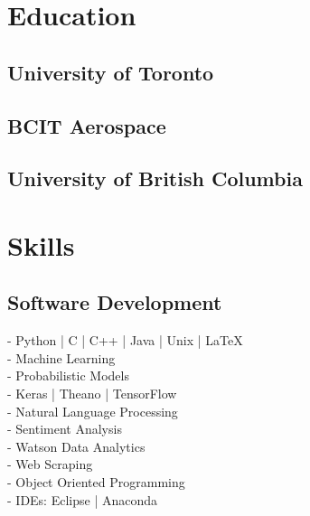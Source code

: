 \documentclass[]{deedy-resume-openfont}
\begin{document}
\begin{minipage}[t]{0.35\textwidth} 


\section{Education} 

\subsection{University of Toronto}
\sectionsep

\subsection{BCIT Aerospace}
\sectionsep

\subsection{University of British Columbia}
\sectionsep


\section{Skills}

\subsection{Software Development}
- Python | C | C++ | Java | Unix | LaTeX \\
- Machine Learning \\
- Probabilistic Models \\
- Keras | Theano | TensorFlow \\
- Natural Language Processing \\
- Sentiment Analysis \\
- Watson Data Analytics \\
- Web Scraping \\
- Object Oriented Programming \\
- IDEs: Eclipse | Anaconda
\sectionsep



\end{minipage}
\end{document}
